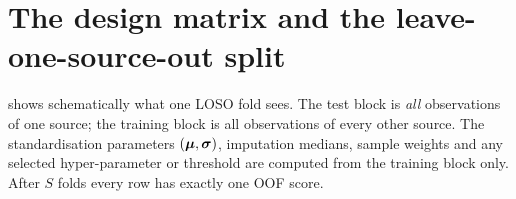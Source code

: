 \section{The design matrix and the leave-one-source-out split}\label{sec:dm-diagram}

 shows schematically what one LOSO fold sees. The test block is \emph{all} observations of one
source; the training block is all observations of every other source. The standardisation parameters
$(\bm{\mu},\bm{\sigma})$, imputation medians, sample weights and any selected hyper-parameter or threshold are computed
from the training block only. After $S$ folds every row has exactly one OOF score.

